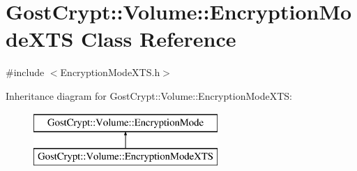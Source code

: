 \hypertarget{class_gost_crypt_1_1_volume_1_1_encryption_mode_x_t_s}{}\section{Gost\+Crypt\+:\+:Volume\+:\+:Encryption\+Mode\+X\+TS Class Reference}
\label{class_gost_crypt_1_1_volume_1_1_encryption_mode_x_t_s}


{\ttfamily \#include $<$Encryption\+Mode\+X\+T\+S.\+h$>$}

Inheritance diagram for Gost\+Crypt\+:\+:Volume\+:\+:Encryption\+Mode\+X\+TS\+:\begin{figure}[H]
\begin{center}
\leavevmode
\includegraphics[height=2.000000cm]{class_gost_crypt_1_1_volume_1_1_encryption_mode_x_t_s}
\end{center}
\end{figure}
